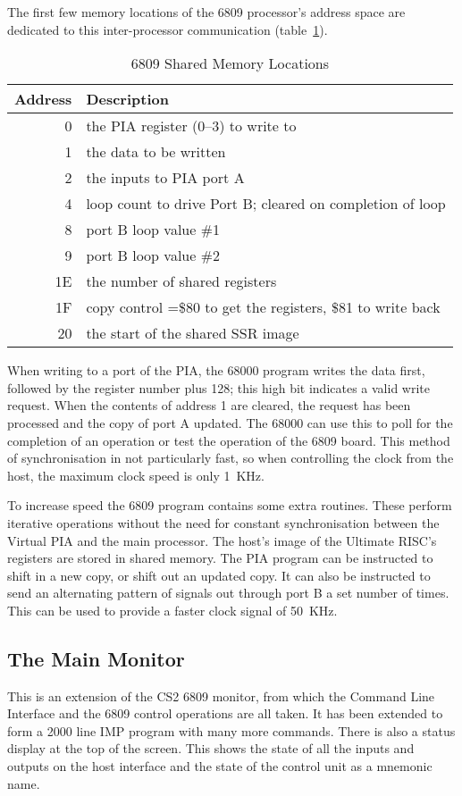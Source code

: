 The first few memory locations of the 6809 processor's address space are dedicated to this inter-processor communication (table~\ref{table:shared}).

\begin{table}
\centering
\begin{tabular}{||r|l||}
\hline
\hline
Address & Description\\
\hline
0 & the PIA register (0--3) to write to\\
1 & the data to be written\\
2 & the inputs to PIA port A\\
\hline
4 &   loop count to drive Port B; cleared on completion of loop\\
8 &  port B loop value \#1\\
9 & port B loop value \#2\\
\hline
1E & the number of shared registers\\
1F & copy control =\$80 to get the registers, \$81 to write back\\
20 & the start of the shared SSR image\\
\hline
\hline
\end{tabular}
\caption{6809 Shared Memory Locations}
\label{table:shared}
\end{table}

When writing to a port of the PIA,
the 68000 program  writes the data first, followed by the register number plus 128;
this high bit  indicates a  valid write request.
When the contents of address 1 are cleared, the request has been processed and the copy of port A updated. The 68000 can use this to poll for the completion of an operation or test the operation of the 6809 board.
This method of synchronisation in not particularly fast, so
when controlling the clock from the host, the maximum clock speed is only 1~KHz.

To increase speed the 6809 program  contains  some extra routines. These perform iterative operations without the need for constant synchronisation between the Virtual PIA and the main processor.
The host's image of the Ultimate RISC's registers are stored in shared memory.
The PIA program can be instructed to shift in a new copy, or shift out an updated copy.
It can also be instructed to send an alternating pattern of signals out through port B a set number of times. 
This can be used to provide a faster clock signal of 50~KHz.

\subsection{The Main Monitor}
This is an extension of the CS2 6809 monitor, from which the Command Line Interface and the 6809 control operations are all taken.
It has been extended to form a 2000 line IMP program with many more commands.
There is also a status display at the top of the screen.
This shows the state of all the inputs and outputs on the host interface and 
the state of the control unit  as a mnemonic name.


